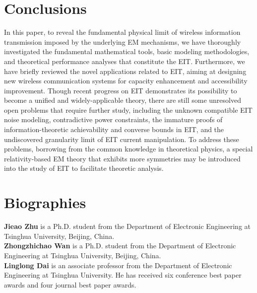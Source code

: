 \documentclass[journal,twocolumn]{IEEEtran}
\begin{document}
\section{Conclusions}
In this paper, to reveal the fundamental physical limit of wireless information transmission imposed by the underlying EM mechanisms, we have thoroughly investigated the fundamental mathematical tools, basic modeling methodologies, and theoretical performance analyses that constitute the EIT. 
Furthermore, we have briefly reviewed the novel applications related to EIT, aiming at designing new wireless communication systems for capacity enhancement and accessibility improvement. Though recent progress on EIT demonstrates its possibility to become a unified and widely-applicable theory, there are still some unresolved open problems that require further study, including the unknown compatible EIT noise modeling, contradictive power constraints, the immature proofs of information-theoretic achievability and converse bounds in EIT, and the undiscovered granularity limit of EIT current manipulation. %
To address these problems, borrowing from the common knowledge in theoretical physics, a special relativity-based EM theory that exhibits more symmetries may be introduced into the study of EIT to facilitate theoretic analysis.  


\footnotesize




\normalsize
\section*{Biographies}

{\bf Jieao Zhu} is a Ph.D. student from the Department of Electronic Engineering at Tsinghua University, Beijing, China.
\\

{\bf Zhongzhichao Wan} is a Ph.D. student from the Department of Electronic Engineering at Tsinghua University, Beijing, China.
\\


{\bf Linglong Dai} is an associate professor from the Department of Electronic Engineering at Tsinghua University. He has received six conference best paper awards and four journal best paper awards. 
\end{document}
